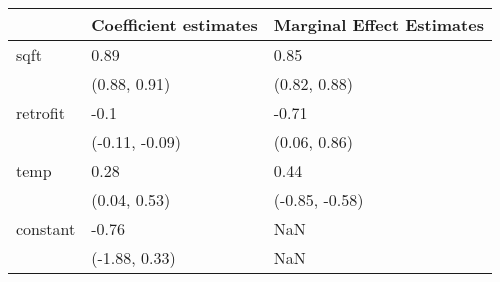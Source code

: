 \begin{tabular}{lll}
\toprule
{} & Coefficient estimates & Marginal Effect Estimates \\
\midrule
sqft     &                  0.89 &                      0.85 \\
         &          (0.88, 0.91) &              (0.82, 0.88) \\
retrofit &                  -0.1 &                     -0.71 \\
         &        (-0.11, -0.09) &              (0.06, 0.86) \\
temp     &                  0.28 &                      0.44 \\
         &          (0.04, 0.53) &            (-0.85, -0.58) \\
constant &                 -0.76 &                       NaN \\
         &         (-1.88, 0.33) &                       NaN \\
\bottomrule
\end{tabular}
